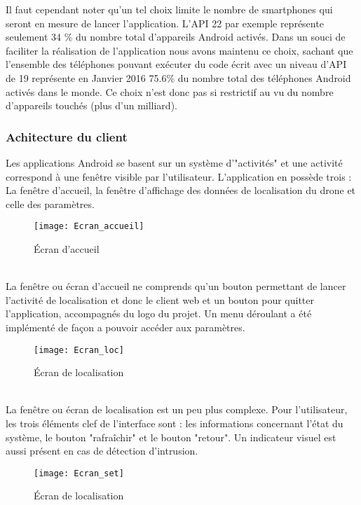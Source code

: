 	Il faut cependant noter qu'un tel choix limite le nombre de smartphones qui seront en mesure de lancer l'application. L'API 22 par exemple représente seulement 34 \% du nombre total d'appareils Android activés. Dans un souci de faciliter la réalisation de l'application nous avons maintenu ce choix, sachant que l'ensemble des téléphones pouvant exécuter du code écrit avec un niveau d'API de 19 représente en Janvier 2016 75.6\% du nombre total des téléphones Android activés dans le monde. Ce choix n'est donc pas si restrictif au vu du nombre d'appareils touchés (plus d'un milliard).

\subsubsection{Achitecture du client}

	Les applications Android se basent sur un système d'"activités" et une activité correspond à une fenêtre visible par l'utilisateur. L'application en possède trois : La fenêtre d'accueil, la fenêtre d'affichage des données de localisation du drone et celle des paramètres.
	
	\begin{figure}[!h]
  	\centering
 	 \texttt{[image: Ecran\_accueil]}
 		 \caption{Écran d'accueil}
 	 \label{fig:Ecran_accueil}
	\end{figure}
	~\\
	
	 La fenêtre ou écran d'accueil ne comprends qu'un bouton permettant de lancer l'activité de localisation et donc le client web et un bouton pour quitter l'application, accompagnés du logo du projet. Un menu déroulant a été implémenté de façon a pouvoir accéder aux paramètres.
	
	\begin{figure}[!h]
  	\centering
 	 \texttt{[image: Ecran\_loc]}
 		 \caption{Écran de localisation}
 	 \label{fig:Ecran_loc}
	\end{figure}
	~\\
	
	 La fenêtre ou écran de localisation est un peu plus complexe. Pour l'utilisateur, les trois éléments clef de l'interface sont : les informations concernant l'état du système, le bouton "rafraîchir" et le bouton "retour". Un indicateur visuel est aussi présent en cas de détection d'intrusion.

	\begin{figure}[!h]
  	\centering
 	 \texttt{[image: Ecran\_set]}
 		 \caption{Écran de localisation}
 	 \label{fig:Ecran_set}
	\end{figure}
	~\\	
	

